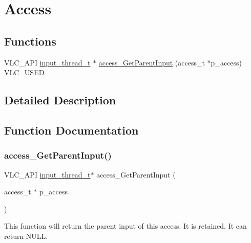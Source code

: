 \hypertarget{group__access}{}\section{Access}
\label{group__access}
\subsection*{Functions}
\begin{DoxyCompactItemize}
\item 
V\+L\+C\+\_\+\+A\+PI \hyperlink{structinput__thread__t}{input\+\_\+thread\+\_\+t} $\ast$ \hyperlink{group__access_ga4bab557b955d793409abe082e09820e2}{access\+\_\+\+Get\+Parent\+Input} (access\+\_\+t $\ast$p\+\_\+access) V\+L\+C\+\_\+\+U\+S\+ED
\end{DoxyCompactItemize}


\subsection{Detailed Description}


\subsection{Function Documentation}
\mbox{\label{group__access_ga4bab557b955d793409abe082e09820e2}} 
\subsubsection{\texorpdfstring{access\+\_\+\+Get\+Parent\+Input()}{access\_GetParentInput()}}
{\footnotesize\ttfamily V\+L\+C\+\_\+\+A\+PI \hyperlink{structinput__thread__t}{input\+\_\+thread\+\_\+t}$\ast$ access\+\_\+\+Get\+Parent\+Input (\begin{DoxyParamCaption}\item[{access\+\_\+t $\ast$}]{p\+\_\+access }\end{DoxyParamCaption})}

This function will return the parent input of this access. It is retained. It can return N\+U\+LL. 